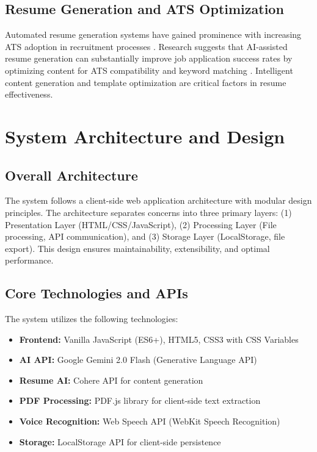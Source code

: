 \documentclass[conference]{IEEEtran}
\begin{document}
\subsection{Resume Generation and ATS Optimization}
Automated resume generation systems have gained prominence with increasing ATS adoption in recruitment processes \cite{black2020}. Research suggests that AI-assisted resume generation can substantially improve job application success rates by optimizing content for ATS compatibility and keyword matching \cite{raghavan2020}. Intelligent content generation and template optimization are critical factors in resume effectiveness.

\section{System Architecture and Design}

\subsection{Overall Architecture}
The system follows a client-side web application architecture with modular design principles. The architecture separates concerns into three primary layers: (1) Presentation Layer (HTML/CSS/JavaScript), (2) Processing Layer (File processing, API communication), and (3) Storage Layer (LocalStorage, file export). This design ensures maintainability, extensibility, and optimal performance.

\subsection{Core Technologies and APIs}
The system utilizes the following technologies:
\begin{itemize}[itemsep=0pt, parsep=0pt, leftmargin=*]
    \item \textbf{Frontend:} Vanilla JavaScript (ES6+), HTML5, CSS3 with CSS Variables
    \item \textbf{AI API:} Google Gemini 2.0 Flash (Generative Language API) \cite{google2024}
    \item \textbf{Resume AI:} Cohere API for content generation \cite{cohere2024}
    \item \textbf{PDF Processing:} PDF.js library for client-side text extraction \cite{mozilla2024}
    \item \textbf{Voice Recognition:} Web Speech API (WebKit Speech Recognition)
    \item \textbf{Storage:} LocalStorage API for client-side persistence
\end{itemize}
\end{document}
